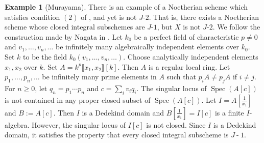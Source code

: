 \documentclass[11pt]{amsart}
\theoremstyle{plain}
\theoremstyle{definition}
\newtheorem{example}[theorem]{Example}
\numberwithin{equation}{section}
\numberwithin{theorem}{section}
\begin{document}
\begin{example}[Murayama]\label{ex:murayama}
    There is an example of a Noetherian scheme which satisfies condition $(2)$ of , and yet is not $J\textrm{-}2$. That is, there exists a Noetherian scheme whose closed integral subschemes are $J\textrm{-}1$, but $X$ is not $J\textrm{-}2$. We follow the construction made by Nagata in \cite[$\S 4$]{Nagata:1959}. Let $k_0$ be a perfect field of characteristic $p\not=0$ and $v_1,\ldots,v_n, \ldots$ be infinitely many algebraically independent elements over $k_0$. Set $k$ to be the field $k_0(v_1,\ldots,v_n,\ldots)$. Choose analytically independent elements $x_1,x_2$ over $k$. Set $A=k^p \llbracket x_1,x_2\rrbracket [k]$. Then $A$ is a regular local ring. Let $p_1,\ldots,p_n,\ldots$ be infinitely many prime elements in $A$ such that $p_i A \not= p_j A$ if $i\not= j$. For $n\geq 0$, let $q_n = p_1 \cdots p_n$ and $c= \sum_i v_i q_i$. The singular locus of $\operatorname{Spec}(A[c])$ is not contained in any proper closed subset of $\operatorname{Spec}(A[c])$. Let $I=A[\frac{1}{x_1}]$ and $B:=A[c]$. Then $I$ is a Dedekind domain and $B[\frac{1}{x_1}]=I[c]$ is a finite $I$-algebra. However, the singular locus of $I[c]$ is not closed. Since $I$ is a Dedekind domain, it satisfies the property that every closed integral subscheme is $J\operatorname{-}1$.
\end{example}



\end{document}
